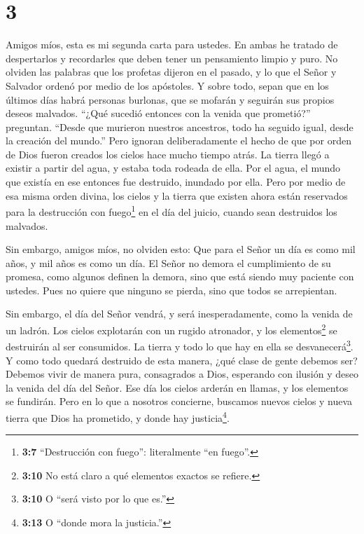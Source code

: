 \hypertarget{section-2}{%
\section{3}\label{section-2}}

 Amigos míos, esta es mi segunda carta para ustedes. En
ambas he tratado de despertarlos y recordarles que deben tener un
pensamiento limpio y puro.  No olviden las palabras que los
profetas dijeron en el pasado, y lo que el Señor y Salvador ordenó por
medio de los apóstoles.  Y sobre todo, sepan que en los
últimos días habrá personas burlonas, que se mofarán y seguirán sus
propios deseos malvados.  ``¿Qué sucedió entonces con la
venida que prometió?'' preguntan. ``Desde que murieron nuestros
ancestros, todo ha seguido igual, desde la creación del mundo.''
 Pero ignoran deliberadamente el hecho de que por orden de
Dios fueron creados los cielos hace mucho tiempo atrás. La tierra llegó
a existir a partir del agua, y estaba toda rodeada de ella. 
Por el agua, el mundo que existía en ese entonces fue destruido,
inundado por ella.  Pero por medio de esa misma orden
divina, los cielos y la tierra que existen ahora están reservados para
la destrucción con fuego\footnote{\textbf{3:7} ``Destrucción con
  fuego'': literalmente ``en fuego''.} en el día del juicio, cuando sean
destruidos los malvados.

 Sin embargo, amigos míos, no olviden esto: Que para el
Señor un día es como mil años, y mil años es como un día. 
El Señor no demora el cumplimiento de su promesa, como algunos definen
la demora, sino que está siendo muy paciente con ustedes. Pues no quiere
que ninguno se pierda, sino que todos se arrepientan.

 Sin embargo, el día del Señor vendrá, y será
inesperadamente, como la venida de un ladrón. Los cielos explotarán con
un rugido atronador, y los elementos\footnote{\textbf{3:10} No está
  claro a qué elementos exactos se refiere.} se destruirán al ser
consumidos. La tierra y todo lo que hay en ella se
desvanecerá\footnote{\textbf{3:10} O ``será visto por lo que es.''}.
 Y como todo quedará destruido de esta manera, ¿qué clase
de gente debemos ser? Debemos vivir de manera pura, consagrados a Dios,
 esperando con ilusión y deseo la venida del día del Señor.
Ese día los cielos arderán en llamas, y los elementos se fundirán.
 Pero en lo que a nosotros concierne, buscamos nuevos
cielos y nueva tierra que Dios ha prometido, y donde hay
justicia\footnote{\textbf{3:13} O ``donde mora la justicia.''}.


